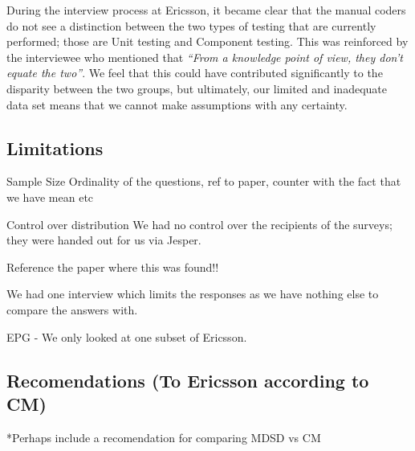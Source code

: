 \documentclass[final_report_innit.tex]{subfiles}
\begin{document}
During the interview process at Ericsson, it became clear that the manual coders do not see a distinction between the two types of
testing that are currently performed; those are Unit testing and Component testing. This was reinforced by the interviewee who mentioned that \textit{``From a knowledge point of view, they don't equate the two''}. We feel that this could have contributed significantly to the disparity between the two groups, but ultimately, our limited and inadequate data set means that we cannot make assumptions with any certainty.

\subsection*{Limitations}

Sample Size
Ordinality of the questions, ref to paper, counter with the fact that we have mean etc

Control over distribution
We had no control over the recipients of the surveys; they were handed out for us via Jesper.

Reference the paper where this was found!!

We had one interview which limits the responses as we have nothing else to compare the answers with.

EPG - We only looked at one subset of Ericsson.

\subsection*{Recomendations (To Ericsson according to CM)}

*Perhaps include a recomendation for comparing MDSD vs CM
\end{document}
